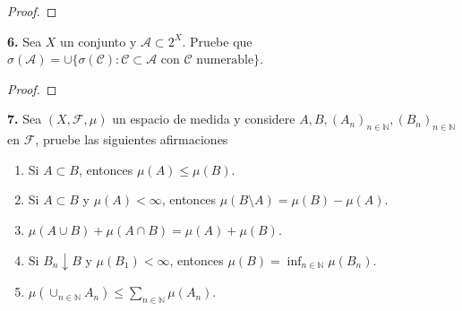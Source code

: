 \documentclass{article}
\newenvironment{statement}[1]{\smallskip\noindent\color[rgb]{1.00,0.00,0.50} {\bf #1.}}{}
\theoremstyle{definition}
\theoremstyle{remark}
\newcommand{\BN}{\mathbb N}
\begin{document}
\begin{proof}
\end{proof}

\begin{statement}{6}
  Sea $X$ un conjunto y $\mathcal{A} \subset 2^X$. Pruebe que $\sigma(\mathcal{A}) = \cup \{\sigma(\mathcal{C}) : \mathcal{C} \subset \mathcal{A} \text{ con } \mathcal{C} \text{ numerable}\}$.
\end{statement}

\begin{proof}
\end{proof}

\begin{statement}{7}
  Sea $(X, \mathcal{F}, \mu)$ un espacio de medida y considere $A, B, (A_n)_{n \in \BN}, (B_n)_{n \in \BN}$ en $\mathcal{F}$, pruebe las siguientes afirmaciones
  \begin{enumerate}
    \item Si $A \subset B$, entonces $\mu(A) \leq \mu(B)$.
    \item Si $A \subset B$ y $\mu(A) < \infty$, entonces $\mu(B \setminus A) = \mu(B) - \mu(A)$.
    \item $\mu(A \cup B) + \mu(A \cap B) = \mu(A) + \mu(B)$.
    \item Si $B_n \downarrow B$ y $\mu(B_1) < \infty$, entonces $\mu(B) = \inf_{n \in \BN} \mu(B_n)$.
    \item $\mu(\cup_{n \in \BN} A_n) \leq \sum_{n \in \BN} \mu(A_n)$.
  \end{enumerate}
\end{statement}
\end{document}
